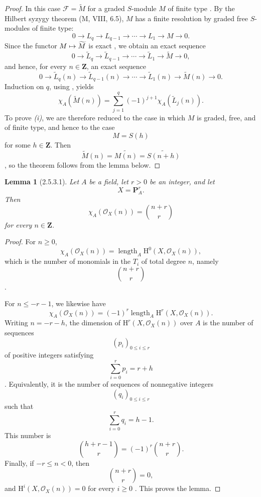 \documentclass[oneside]{amsart}
\theoremstyle{ega-env-style}
\theoremstyle{ega-thm-env-style}
\newtheorem*{lemma}{Lemma}
\theoremstyle{ega-defn-env-style}
\def\mathcal{\mathscr}
\def\sh{\mathcal}                   %
\def\bb{\mathbf}                    %
\def\leq{\leqslant}                 %
\def\geq{\geqslant}                 %
\def\HH{\mathrm{H}}                 %
\let\mapstoo\mapsto
\renewcommand{\mapsto}{\mathchoice{\longmapsto}{\mapstoo}{\mapstoo}{\mapstoo}}
\newcommand{\oldpage}[2][]{{\marginnote{\normalfont{\textbf{#1}~|~#2}}}\ignorespaces}
\let\EGAOriginalLabel\label
\renewcommand{\label}[1]{\phantomsection\EGAOriginalLabel{#1}}
\begin{document}
\begin{proof}
In this case $\sh{F}=\widetilde{M}$ for a graded $S$-module $M$ of finite type .
By the Hilbert syzygy theorem (M, VIII, 6.5), $M$ has a finite resolution by graded free $S$-modules of finite type:
\[
  0\longrightarrow L_q
  \longrightarrow L_{q-1}
  \longrightarrow\cdots
  \longrightarrow L_1
  \longrightarrow M
  \longrightarrow0.
\]
Since the functor $M\mapsto\widetilde{M}$ is exact , we obtain an exact sequence
\[
  0\longrightarrow\widetilde{L}_q
  \longrightarrow\widetilde{L}_{q-1}
  \longrightarrow\cdots
  \longrightarrow\widetilde{L}_1
  \longrightarrow\widetilde{M}
  \longrightarrow0,
\]
and hence, for every $n\in\bb Z$, an exact sequence
\[
  0\longrightarrow\widetilde{L}_q(n)
  \longrightarrow\widetilde{L}_{q-1}(n)
  \longrightarrow\cdots
  \longrightarrow\widetilde{L}_1(n)
  \longrightarrow\widetilde{M}(n)
  \longrightarrow0.
\]
Induction on $q$, using , yields
\[
  \chi_A(\widetilde{M}(n))
  =
  \sum_{j=1}^{q}
  (-1)^{j+1}\chi_A(\widetilde{L}_j(n)).
\]
To prove \emph{(i)}, we are therefore reduced to the case in which $M$ is graded, free, and of finite type, and hence to the case
\[
  M=S(h)
\]
for some $h\in\bb Z$.
Then
\[
  \widetilde{M}(n)
  =
  \widetilde{M(n)}
  =
  \widetilde{S(n+h)}
\]
, so the theorem follows from the lemma below.
\end{proof}

\oldpage[III]{111}
\begin{lemma}[2.5.3.1]
\label{III.2.5.3.1}
Let $A$ be a field, let $r>0$ be an integer, and let
\[
  X=\mathbf{P}_A^r.
\]
Then
\[
  \chi_A(\sh{O}_X(n))
  =
  \binom{n+r}{r}
\]
for every $n\in\bb Z$.
\end{lemma}

\begin{proof}
For $n\geq0$,
\[
  \chi_A(\sh{O}_X(n))
  =
  \operatorname{length}_A\HH^0(X,\sh{O}_X(n)),
\]
which is the number of monomials in the $T_i$ of total degree $n$, namely
\[
  \binom{n+r}{r}
\]
.

For $n\leq-r-1$, we likewise have
\[
  \chi_A(\sh{O}_X(n))
  =
  (-1)^r\operatorname{length}_A\HH^r(X,\sh{O}_X(n)).
\]
Writing $n=-r-h$, the dimension of $\HH^r(X,\sh{O}_X(n))$ over $A$ is the number of sequences
\[
  (p_i)_{0\leq i\leq r}
\]
of positive integers satisfying
\[
  \sum_{i=0}^{r}p_i=r+h
\]
.
Equivalently, it is the number of sequences of nonnegative integers
\[
  (q_i)_{0\leq i\leq r}
\]
such that
\[
  \sum_{i=0}^{r}q_i=h-1.
\]
This number is
\[
  \binom{h+r-1}{r}
  =
  (-1)^r\binom{n+r}{r}.
\]
Finally, if $-r\leq n<0$, then
\[
  \binom{n+r}{r}=0,
\]
and $\HH^i(X,\sh{O}_X(n))=0$ for every $i\geq0$ .
This proves the lemma.
\end{proof}
\end{document}
